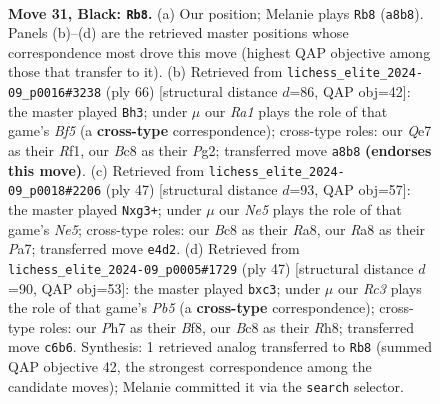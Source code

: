 \documentclass[11pt]{article}
\begin{document}
\clearpage

\begin{figure}[p]\centering
\begin{subfigure}{0.46\textwidth}\centering
\resizebox{\linewidth}{!}{%
\newchessgame
\chessboard[
  setfen={r1b2k2/1p2q2p/1Nr5/1R1Q2p1/p3n3/4P1P1/P4PKP/B3R3 b - - 4 31},
  showmover=false,
  pgfstyle=straightmove, color=movearrow, markmove={a8-b8}
]}
\caption{}
\end{subfigure}\hfill
\begin{subfigure}{0.46\textwidth}\centering
\resizebox{\linewidth}{!}{%
\newchessgame
\chessboard[
  setfen={5r1k/1br1qp1p/pn4p1/3pPBR1/5Q2/2PN4/6PP/5R1K w - - 0 34},
  showmover=false,
  pgfstyle=straightmove, color=movearrow, markmove={f5-h3}
]}
\caption{}
\end{subfigure}
\\[4pt]
\begin{subfigure}{0.46\textwidth}\centering
\resizebox{\linewidth}{!}{%
\newchessgame
\chessboard[
  setfen={r6k/p1p3pp/2p1Q1q1/2b2r2/4n3/2P3N1/PP4PP/R1B1R2K b - - 9 24},
  showmover=false,
  pgfstyle=straightmove, color=movearrow, markmove={e4-g3}
]}
\caption{}
\end{subfigure}\hfill
\begin{subfigure}{0.46\textwidth}\centering
\resizebox{\linewidth}{!}{%
\newchessgame
\chessboard[
  setfen={5b1r/pk3p2/2q1pP2/3rn3/1pp2B2/2N3P1/1P2QP1P/R4RK1 b - - 7 24},
  showmover=false,
  pgfstyle=straightmove, color=movearrow, markmove={b4-c3}
]}
\caption{}
\end{subfigure}
\caption{\textbf{Move 31, Black: \texttt{Rb8}.} (a) Our position; Melanie plays \texttt{Rb8} (\texttt{a8b8}). Panels (b)--(d) are the retrieved master positions whose correspondence most drove this move (highest QAP objective among those that transfer to it). (b) Retrieved from \texttt{lichess\_elite\_2024-09\_p0016\#3238} (ply 66) [structural distance $d$=86, QAP obj=42]: the master played \texttt{Bh3}; under $\mu$ our \emph{Ra1} plays the role of that game's \emph{Bf5} (a \textbf{cross-type} correspondence); cross-type roles: our \emph{Q}e7 as their \emph{R}f1, our \emph{B}c8 as their \emph{P}g2; transferred move \texttt{a8b8} \textbf{(endorses this move)}. (c) Retrieved from \texttt{lichess\_elite\_2024-09\_p0018\#2206} (ply 47) [structural distance $d$=93, QAP obj=57]: the master played \texttt{Nxg3+}; under $\mu$ our \emph{Ne5} plays the role of that game's \emph{Ne5}; cross-type roles: our \emph{B}c8 as their \emph{R}a8, our \emph{R}a8 as their \emph{P}a7; transferred move \texttt{e4d2}. (d) Retrieved from \texttt{lichess\_elite\_2024-09\_p0005\#1729} (ply 47) [structural distance $d$=90, QAP obj=53]: the master played \texttt{bxc3}; under $\mu$ our \emph{Rc3} plays the role of that game's \emph{Pb5} (a \textbf{cross-type} correspondence); cross-type roles: our \emph{P}h7 as their \emph{B}f8, our \emph{B}c8 as their \emph{R}h8; transferred move \texttt{c6b6}. Synthesis: 1 retrieved analog transferred to \texttt{Rb8} (summed QAP objective 42, the strongest correspondence among the candidate moves); Melanie committed it via the \texttt{search} selector.}
\label{fig:thought-m61}
\end{figure}
\end{document}
